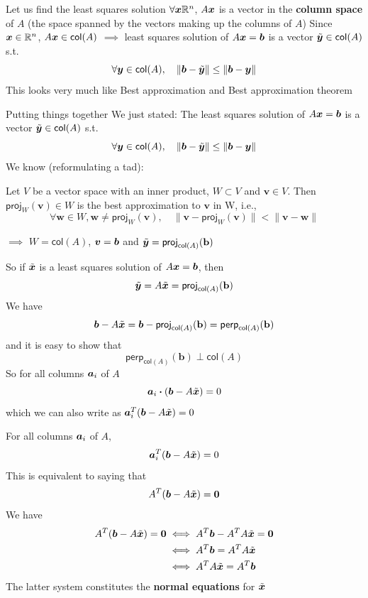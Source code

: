 \documentclass[aspectratio=169]{beamer}
\begin{document}
\begin{frame}{Let us find the least squares solution}
$\forall \bm{x}\mathbb{R}^n$, $A\bm{x}$ is a vector in the \textbf{column space} of $A$ (the space spanned by the vectors making up the columns of $A$)
\vfill
Since $\bm{x}\in\mathbb{R}^n$, $A\bm{x}\in\mathsf{col}(A)$
\vfill
$\implies$ least squares solution of $A\bm{x}=\bm{b}$ is a vector $\tilde{\bm{y}}\in\mathsf{col}(A)$ s.t.
\[
\forall\bm{y}\in\mathsf{col}(A),\quad\|\bm{b}-\tilde{\bm{y}}\|\leq\|\bm{b}-\bm{y}\|
\]
\vfill
This looks very much like Best approximation and Best approximation theorem
\end{frame}

\begin{frame}{Putting things together}
We just stated: The least squares solution of $A\bm{x}=\bm{b}$ is a vector $\tilde{\bm{y}}\in\mathsf{col}(A)$ s.t.
\[
\forall\bm{y}\in\mathsf{col}(A),\quad\|\bm{b}-\tilde{\bm{y}}\|\leq\|\bm{b}-\bm{y}\|
\]
\vfill
We know (reformulating a tad):
\begin{theorem}
Let $V$ be a vector space with an inner product, $W\subset V$ and $\mathbf{v}\in V$. Then $\mathsf{proj}_W(\mathbf{v})\in W$ is the best approximation to $\mathbf{v}$ in W, i.e.,
\[
\forall\mathbf{w}\in W, \mathbf{w}\neq\mathsf{proj}_W(\mathbf{v}), \quad
\|\mathbf{v}-\mathsf{proj}_W(\mathbf{v})\| < \|\mathbf{v}-\mathbf{w}\|
\]
\end{theorem}
\vfill
$\implies$ $W=\mathsf{col}(A)$, $\bm{v}=\bm{b}$ and $\tilde{\bm{y}}=\mathsf{proj}_{\mathsf{col}(A)}(\mathbf{b})$
\end{frame}

\begin{frame}
So if $\tilde{\bm{x}}$ is a least squares solution of $A\bm{x}=\bm{b}$, then
\[
\tilde{\bm{y}} = A\tilde{\bm{x}} = \mathsf{proj}_{\mathsf{col}(A)}(\mathbf{b})
\]
\vfill
We have
\[
\bm{b}-A\tilde{\bm{x}} = \bm{b}-\mathsf{proj}_{\mathsf{col}(A)}(\mathbf{b}) 
= \mathsf{perp}_{\mathsf{col}(A)}(\mathbf{b})
\]
and it is easy to show that
\[
\mathsf{perp}_{\mathsf{col}(A)}(\mathbf{b}) \perp \mathsf{col}(A)
\]
\vfill
So for all columns $\bm{a}_i$ of $A$
\[
\bm{a}_i\boldsymbol{\cdot}(\bm{b}-A\tilde{\bm{x}}) = 0
\]
which we can also write as $\bm{a}_i^T(\bm{b}-A\tilde{\bm{x}}) = 0$
\end{frame}

\begin{frame}
For all columns $\bm{a}_i$ of $A$,
\[\bm{a}_i^T(\bm{b}-A\tilde{\bm{x}}) = 0
\]
\vfill
This is equivalent to saying that
\[
A^T(\bb-A\tilde\bx) = \b0
\]
\vfill
We have
\begin{align*}
A^T(\bb-A\tilde\bx) = \b0 &\iff A^T\bb - A^TA\tilde\bx = \b0 \\
&\iff A^T\bb = A^TA\tilde\bx \\
&\iff A^TA\tilde\bx = A^T\bb
\end{align*}
The latter system constitutes the \textbf{normal equations} for $\tilde{\bm{x}}$
\end{frame}
\end{document}
